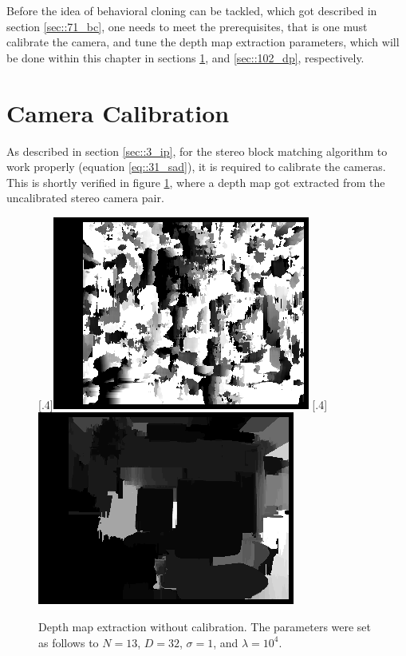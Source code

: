 \FloatBarrier
\label{sec::10_ip}
Before the idea of behavioral cloning can be tackled, which got described in section \ref{sec::71_bc}, one needs to meet the prerequisites, that is one must calibrate the camera, and tune the depth map extraction parameters, which will be done within this chapter in sections \ref{sec::10_cc}, and \ref{sec::102_dp}, respectively.
\section{Camera Calibration}
\label{sec::10_cc}
As described in section \ref{sec::3_ip}, for the stereo block matching algorithm to work properly (equation \ref{eq::31_sad}), it is required to calibrate the cameras. This is shortly verified in figure \ref{fig::101_no_calib}, where a depth map got extracted from the uncalibrated stereo camera pair.
\begin{figure}[h!]
	\centering
	[.4\linewidth]{\includegraphics[scale=.3]{chapters/10_image_processing_experiments/img/disp_no_calib.png}}
	[.4\linewidth]{\includegraphics[scale=.3]{chapters/10_image_processing_experiments/img/wls_no_calib.png}}
	\caption{Depth map extraction without calibration. The parameters were set as follows to $N=13$, $D=32$, $\sigma = 1$, and $\lambda=10^4$.}
	\label{fig::101_no_calib}
\end{figure}
